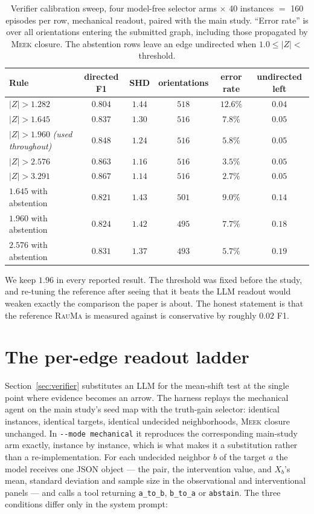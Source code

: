 \documentclass{article}
\newcommand{\rauma}{\textsc{RauMa}}
\newcommand{\meek}{\textsc{Meek}}
\begin{document}
\begin{table}[h]
\caption{Verifier calibration sweep, four model-free selector arms $\times$ 40 instances $=$
160 episodes per row, mechanical readout, paired with the main study. ``Error rate'' is over
all orientations entering the submitted graph, including those propagated by \meek{} closure.
The abstention rows leave an edge undirected when $1.0 \leq |Z| <$ threshold.}
\label{tab:verifier}
\centering
\small
\setlength{\tabcolsep}{5pt}
\begin{tabular}{lccccc}
\toprule
Rule & directed F1 & SHD & orientations & error rate & undirected left \\
\midrule
$|Z| > 1.282$ & $0.804$ & $1.44$ & $518$ & $12.6\%$ & $0.04$ \\
$|Z| > 1.645$ & $0.837$ & $1.30$ & $516$ & $7.8\%$ & $0.05$ \\
$|Z| > 1.960$ \emph{(used throughout)} & $0.848$ & $1.24$ & $516$ & $5.8\%$ & $0.05$ \\
$|Z| > 2.576$ & $0.863$ & $1.16$ & $516$ & $3.5\%$ & $0.05$ \\
$|Z| > 3.291$ & $\mathbf{0.867}$ & $\mathbf{1.14}$ & $516$ & $\mathbf{2.7\%}$ & $0.05$ \\
\midrule
$1.645$ with abstention & $0.821$ & $1.43$ & $501$ & $9.0\%$ & $0.14$ \\
$1.960$ with abstention & $0.824$ & $1.42$ & $495$ & $7.7\%$ & $0.18$ \\
$2.576$ with abstention & $0.831$ & $1.37$ & $493$ & $5.7\%$ & $0.19$ \\
\bottomrule
\end{tabular}
\end{table}

We keep $1.96$ in every reported result. The threshold was fixed before the study, and
re-tuning the reference after seeing that it beats the LLM readout would weaken exactly the
comparison the paper is about. The honest statement is that the reference \rauma{} is
measured against is conservative by roughly $0.02$ F1.

\section{The per-edge readout ladder}
\label{app:ladder}

Section~\ref{sec:verifier} substitutes an LLM for the mean-shift test at the single point
where evidence becomes an arrow. The harness replays the mechanical agent on the main study's
seed map with the truth-gain selector: identical instances, identical targets, identical
undecided neighborhoods, \meek{} closure unchanged. In \texttt{-\/-mode mechanical} it
reproduces the corresponding main-study arm exactly, instance by instance, which is what makes
it a substitution rather than a re-implementation. For each undecided neighbor $b$ of the
target $a$ the model receives one JSON object --- the pair, the intervention value, and $X_b$'s
mean, standard deviation and sample size in the observational and interventional panels --- and
calls a tool returning \texttt{a\_to\_b}, \texttt{b\_to\_a} or \texttt{abstain}. The three
conditions differ only in the system prompt:
\end{document}
